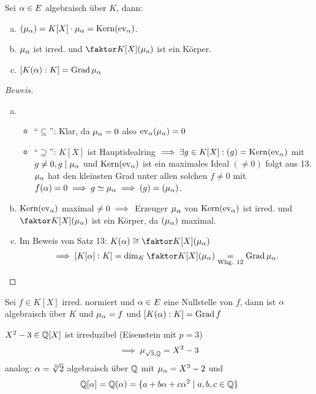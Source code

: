 \documentclass[a4paper]{report}
\begin{document}
\begin{prop}
  Sei $\alpha \in E$ algebraisch über $K$, dann:
  \begin{enumerate}[(a)]
    \item $(\mu_{\alpha}) = K[X]\cdot\mu_{\alpha} = \operatorname{Kern}(\operatorname{ev}_{\alpha})$.
    \item $\mu_{\alpha}$ ist irred. und $\fak {K[X]}{(\mu_{a})}$ ist ein Körper.
    \item $[K(\alpha) : K] = \operatorname{Grad} \mu_{\alpha}$
  \end{enumerate}

  \begin{proof}[Beweis]\item
    \begin{enumerate}[(a)]
      \item
            \begin{itemize}
              \item ``$\subseteq$'': Klar, da $\mu_{\alpha} = 0$ also $\operatorname{ev}_{\alpha}(\mu_{\alpha}) = 0$
              \item ``$\supseteq$'': $K[X]$ ist Hauptidealring $\implies \exists g \in K[X] : (g) = \operatorname{Kern}(\operatorname{ev}_{\alpha})$ mit $g \ne 0, g \mid \mu_{\alpha}$ und $\operatorname{Kern}(\operatorname{ev}_{\alpha})$ ist ein maximales Ideal $(\ne 0)$ folgt aus 13. $\mu_{\alpha}$ hat den kleinsten Grad unter allen solchen $f \ne 0$ mit $f(\alpha) = 0 \implies g \simeq \mu_{\alpha} \implies (g) = (\mu_{\alpha})$.
            \end{itemize}
      \item $\operatorname{Kern}(\operatorname{ev}_{\alpha})$ maximal $\ne 0 \implies$ Erzeuger $\mu_{\alpha}$ von $\operatorname{Kern}(\operatorname{ev}_{\alpha})$ ist irred. und $\fak{K[X]}{(\mu_{\a})}$ ist ein Körper, da $(\mu_{\alpha})$ maximal.
      \item Im Beweis von Satz 13: $K(\a) \cong \fak{K[X]}{(\mu_{\a})}$
            \[\imp [K[\a] : K] = \dim_{K} \fak{K[X]}{(\mu_{\a})} \underset{\text{Whg. 12}} = \grad \mu_{\a}. \qedhere\]
    \end{enumerate}
  \end{proof}
\end{prop}

\begin{kor}
  Sei $f \in K[X]$ irred. normiert und $\alpha \in E$ eine Nullstelle von $f$, dann ist $\alpha$ algebraisch über $K$ und $\mu_{\alpha} = f$ und $[K(\alpha) : K] = \operatorname{Grad} f$
  \begin{bsp*}
    $X^{2} - 3 \in \mathbb{Q}[X]$  ist irreduzibel (Eisenstein mit $p = 3$) \[\implies \mu_{\sqrt 3, \mathbb{Q}} = X^{2} - 3\]
    analog: $\alpha = \sqrt[3]{2}$ algebraisch über $\mathbb{Q}$ mit $\mu_{\alpha} = X^{3} - 2$ und
    \[\mathbb{Q}[\alpha] = \mathbb{Q}(\alpha) = \{a + b\alpha + c\alpha^{2} \mid a, b, c \in \mathbb{Q}\}\]
  \end{bsp*}
\end{kor}
\end{document}
